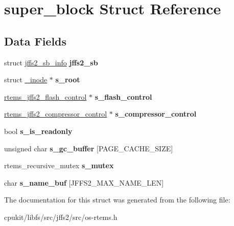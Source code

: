 \hypertarget{structsuper__block}{}\section{super\+\_\+block Struct Reference}
\label{structsuper__block}
\subsection*{Data Fields}
\begin{DoxyCompactItemize}
\item 
\mbox{\label{structsuper__block_ab7e8ee2f6d4a41d1e01e92bef1ef5e94}} 
struct \mbox{\hyperlink{structjffs2__sb__info}{jffs2\+\_\+sb\+\_\+info}} {\bfseries jffs2\+\_\+sb}
\item 
\mbox{\label{structsuper__block_a42641a032d426a3d96db2501b18cf796}} 
struct \mbox{\hyperlink{struct__inode}{\+\_\+inode}} $\ast$ {\bfseries s\+\_\+root}
\item 
\mbox{\label{structsuper__block_ae909e3662725b294cad05d03cca1c3ba}} 
\mbox{\hyperlink{structrtems__jffs2__flash__control}{rtems\+\_\+jffs2\+\_\+flash\+\_\+control}} $\ast$ {\bfseries s\+\_\+flash\+\_\+control}
\item 
\mbox{\label{structsuper__block_a81656c70b83a54a87cb77c72e4733ec8}} 
\mbox{\hyperlink{structrtems__jffs2__compressor__control}{rtems\+\_\+jffs2\+\_\+compressor\+\_\+control}} $\ast$ {\bfseries s\+\_\+compressor\+\_\+control}
\item 
\mbox{\label{structsuper__block_a10c49316b474cc17367e7038db638efb}} 
bool {\bfseries s\+\_\+is\+\_\+readonly}
\item 
\mbox{\label{structsuper__block_acee782050a28a484ee5a59d968446188}} 
unsigned char {\bfseries s\+\_\+gc\+\_\+buffer} \mbox{[}P\+A\+G\+E\+\_\+\+C\+A\+C\+H\+E\+\_\+\+S\+I\+ZE\mbox{]}
\item 
\mbox{\label{structsuper__block_ab1ccfe8ca6d35ff81c766fe43cbf97e5}} 
rtems\+\_\+recursive\+\_\+mutex {\bfseries s\+\_\+mutex}
\item 
\mbox{\label{structsuper__block_a3c2b8ac57737d0bbdcb8ef4d2286723c}} 
char {\bfseries s\+\_\+name\+\_\+buf} \mbox{[}J\+F\+F\+S2\+\_\+\+M\+A\+X\+\_\+\+N\+A\+M\+E\+\_\+\+L\+EN\mbox{]}
\end{DoxyCompactItemize}


The documentation for this struct was generated from the following file\+:\begin{DoxyCompactItemize}
\item 
cpukit/libfs/src/jffs2/src/os-\/rtems.\+h\end{DoxyCompactItemize}
